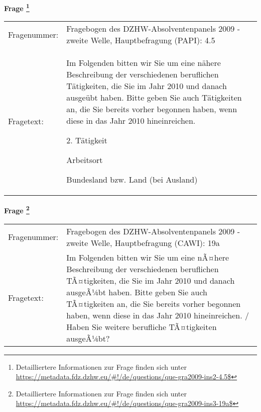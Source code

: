 				\vspace*{0.5cm}
                \noindent\textbf{Frage
	                \footnote{Detailliertere Informationen zur Frage finden sich unter
		              \url{https://metadata.fdz.dzhw.eu/\#!/de/questions/que-gra2009-ins2-4.5$}}}\\
				\begin{tabularx}{\hsize}{@{}lX}
					Fragenummer: &
					  Fragebogen des DZHW-Absolventenpanels 2009 - zweite Welle, Hauptbefragung (PAPI):
					  4.5
 \\
					Fragetext: & Im Folgenden bitten wir Sie um eine nähere Beschreibung der verschiedenen beruflichen Tätigkeiten, die Sie im Jahr 2010 und danach ausgeübt haben. Bitte geben Sie auch Tätigkeiten an, die Sie bereits vorher begonnen haben, wenn diese in das Jahr 2010 hineinreichen.\par  2. Tätigkeit\par  Arbeitsort\par  Bundesland bzw. Land (bei Ausland) \\
				\end{tabularx}
				\vspace*{0.5cm}
                \noindent\textbf{Frage
	                \footnote{Detailliertere Informationen zur Frage finden sich unter
		              \url{https://metadata.fdz.dzhw.eu/\#!/de/questions/que-gra2009-ins3-19a$}}}\\
				\begin{tabularx}{\hsize}{@{}lX}
					Fragenummer: &
					  Fragebogen des DZHW-Absolventenpanels 2009 - zweite Welle, Hauptbefragung (CAWI):
					  19a
 \\
					Fragetext: & Im Folgenden bitten wir Sie um eine nÃ¤here Beschreibung der verschiedenen beruflichen TÃ¤tigkeiten, die Sie im Jahr 2010 und danach ausgeÃ¼bt haben. Bitte geben Sie auch TÃ¤tigkeiten an, die Sie bereits vorher begonnen haben, wenn diese in das Jahr 2010 hineinreichen. / Haben Sie weitere berufliche TÃ¤tigkeiten ausgeÃ¼bt? \\
				\end{tabularx}





